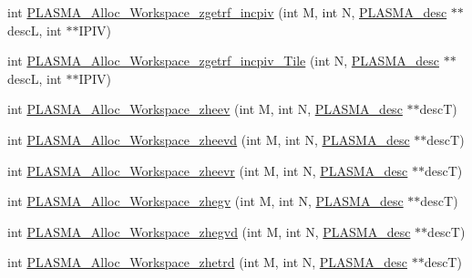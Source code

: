 \begin{DoxyCompactItemize}
int \hyperlink{group__Auxiliary_ga6ed7d98e271f0f8c2c56c15ea0d7d88c_ga6ed7d98e271f0f8c2c56c15ea0d7d88c}{P\+L\+A\+S\+M\+A\+\_\+\+Alloc\+\_\+\+Workspace\+\_\+zgetrf\+\_\+incpiv} (int M, int N, \hyperlink{structplasma__desc__t}{P\+L\+A\+S\+M\+A\+\_\+desc} $\ast$$\ast$desc\+L, int $\ast$$\ast$I\+P\+I\+V)
\item 
int \hyperlink{group__Auxiliary_ga2d5f6fdc08bc160f7c7f75e80ab8a85e_ga2d5f6fdc08bc160f7c7f75e80ab8a85e}{P\+L\+A\+S\+M\+A\+\_\+\+Alloc\+\_\+\+Workspace\+\_\+zgetrf\+\_\+incpiv\+\_\+\+Tile} (int N, \hyperlink{structplasma__desc__t}{P\+L\+A\+S\+M\+A\+\_\+desc} $\ast$$\ast$desc\+L, int $\ast$$\ast$I\+P\+I\+V)
\item 
int \hyperlink{group__Auxiliary_ga133d07f721529d56063b2bae61758643_ga133d07f721529d56063b2bae61758643}{P\+L\+A\+S\+M\+A\+\_\+\+Alloc\+\_\+\+Workspace\+\_\+zheev} (int M, int N, \hyperlink{structplasma__desc__t}{P\+L\+A\+S\+M\+A\+\_\+desc} $\ast$$\ast$desc\+T)
\item 
int \hyperlink{group__Auxiliary_gad6901e128c2ffb84c3d93608943f5917_gad6901e128c2ffb84c3d93608943f5917}{P\+L\+A\+S\+M\+A\+\_\+\+Alloc\+\_\+\+Workspace\+\_\+zheevd} (int M, int N, \hyperlink{structplasma__desc__t}{P\+L\+A\+S\+M\+A\+\_\+desc} $\ast$$\ast$desc\+T)
\item 
int \hyperlink{group__Auxiliary_ga3aaea7baee8171b8dc6188156433f320_ga3aaea7baee8171b8dc6188156433f320}{P\+L\+A\+S\+M\+A\+\_\+\+Alloc\+\_\+\+Workspace\+\_\+zheevr} (int M, int N, \hyperlink{structplasma__desc__t}{P\+L\+A\+S\+M\+A\+\_\+desc} $\ast$$\ast$desc\+T)
\item 
int \hyperlink{group__Auxiliary_ga6c8294345c439929796e09887497f4a7_ga6c8294345c439929796e09887497f4a7}{P\+L\+A\+S\+M\+A\+\_\+\+Alloc\+\_\+\+Workspace\+\_\+zhegv} (int M, int N, \hyperlink{structplasma__desc__t}{P\+L\+A\+S\+M\+A\+\_\+desc} $\ast$$\ast$desc\+T)
\item 
int \hyperlink{group__Auxiliary_ga934877bff16f256ea89fdca4fbbec0b7_ga934877bff16f256ea89fdca4fbbec0b7}{P\+L\+A\+S\+M\+A\+\_\+\+Alloc\+\_\+\+Workspace\+\_\+zhegvd} (int M, int N, \hyperlink{structplasma__desc__t}{P\+L\+A\+S\+M\+A\+\_\+desc} $\ast$$\ast$desc\+T)
\item 
int \hyperlink{group__Auxiliary_gad2b4b3a57dec926659d399ffc2442b45_gad2b4b3a57dec926659d399ffc2442b45}{P\+L\+A\+S\+M\+A\+\_\+\+Alloc\+\_\+\+Workspace\+\_\+zhetrd} (int M, int N, \hyperlink{structplasma__desc__t}{P\+L\+A\+S\+M\+A\+\_\+desc} $\ast$$\ast$desc\+T)
\end{DoxyCompactItemize}


